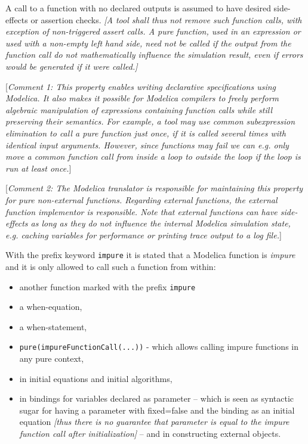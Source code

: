 A call to a function with no declared outputs is assumed to have desired
side-effects or assertion checks. \emph{{[}A tool shall thus not remove
such function calls, with exception of non-triggered assert calls. A
pure function, used in an expression or used with a non-empty left hand
side, need not be called if the output from the function call do not
mathematically influence the simulation result, even if errors would be
generated if it were called.{]}}

{[}\emph{Comment 1: This property enables writing declarative
specifications using Modelica. It also makes it possible for Modelica
compilers to freely perform algebraic manipulation of expressions
containing function calls while still preserving their semantics. For
example, a tool may use common subexpression elimination to call a pure
function just once, if it is called several times with identical input
arguments. However, since functions may fail we can e.g. only move a
common function call from inside a loop to outside the loop if the loop
is run at least once.}{]}

{[}\emph{Comment 2: The Modelica translator is responsible for
maintaining this property for pure non-external functions. Regarding
external functions, the external function implementor is responsible.
Note that external functions can have side-effects as long as they do
not influence the internal Modelica simulation state, e.g. caching
variables for performance or printing trace output to a log file.}{]}

With the prefix keyword \lstinline!impure! it is stated that a Modelica
function is \emph{impure} and it is only allowed to call such a function
from within:

\begin{itemize}
\item
  another function marked with the prefix \lstinline!impure!
\item
  a when-equation,
\item
  a when-statement,
\item
  \lstinline!pure(impureFunctionCall(...))! - which allows calling impure
  functions in any pure context,
\item
  in initial equations and initial algorithms,
\item
  in bindings for variables declared as parameter -- which is seen as
  syntactic sugar for having a parameter with fixed=false and the
  binding as an initial equation \emph{{[}thus there is no guarantee
  that parameter is equal to the impure function call after
  initialization{]}} -- and in constructing external objects.
\end{itemize}


